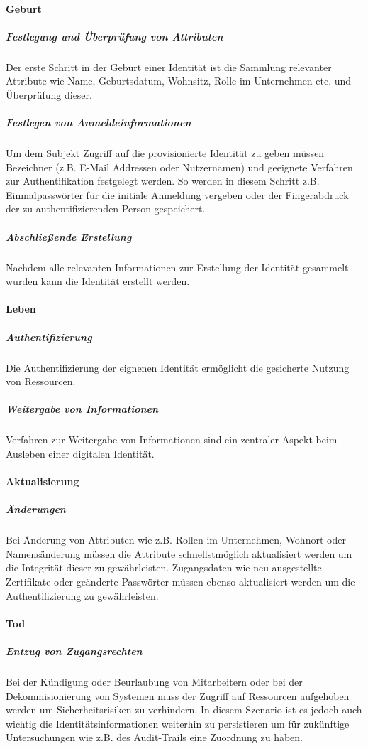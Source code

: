 \documentclass[12pt]{article}
\begin{document}
\paragraph{Geburt}
\subparagraph{Festlegung und Überprüfung von Attributen}
Der erste Schritt in der Geburt einer Identität ist die Sammlung relevanter Attribute wie Name, Geburtsdatum, Wohnsitz, Rolle im Unternehmen etc. und Überprüfung dieser.~\cite{bertino2010identity}
\subparagraph{Festlegen von Anmeldeinformationen}
Um dem Subjekt Zugriff auf die provisionierte Identität zu geben müssen Bezeichner (z.B. E-Mail Addressen oder Nutzernamen) und geeignete Verfahren zur Authentifikation festgelegt werden. So werden in diesem Schritt z.B. Einmalpasswörter für die initiale Anmeldung vergeben oder der Fingerabdruck der zu authentifizierenden Person gespeichert.~\cite{bertino2010identity}
\subparagraph{Abschließende Erstellung}
Nachdem alle relevanten Informationen zur Erstellung der Identität gesammelt wurden kann die Identität erstellt werden.~\cite{bertino2010identity}
\paragraph{Leben}
\subparagraph{Authentifizierung}
Die Authentifizierung der eignenen Identität ermöglicht die gesicherte Nutzung von Ressourcen.~\cite{bertino2010identity}
\subparagraph{Weitergabe von Informationen}
Verfahren zur Weitergabe von Informationen sind ein zentraler Aspekt beim Ausleben einer digitalen Identität.~\cite{bertino2010identity}
\paragraph{Aktualisierung}
\subparagraph{Änderungen}
Bei Änderung von Attributen wie z.B. Rollen im Unternehmen, Wohnort oder Namensänderung müssen die Attribute schnellstmöglich aktualisiert werden um die Integrität dieser zu gewährleisten. Zugangsdaten wie neu ausgestellte Zertifikate oder geänderte Passwörter müssen ebenso aktualisiert werden um die Authentifizierung zu gewährleisten.~\cite{bertino2010identity}
\paragraph{Tod}
\subparagraph{Entzug von Zugangsrechten}
Bei der Kündigung oder Beurlaubung von Mitarbeitern oder bei der Dekommisionierung von Systemen muss der Zugriff auf Ressourcen aufgehoben werden um Sicherheitsrisiken zu verhindern. In diesem Szenario ist es jedoch auch wichtig die Identitätsinformationen weiterhin zu persistieren um für zukünftige Untersuchungen wie z.B. des Audit-Trails eine Zuordnung zu haben.~\cite{bertino2010identity}
\end{document}
